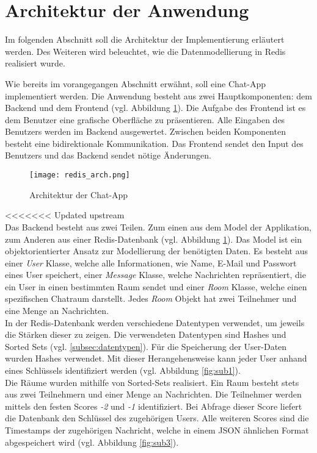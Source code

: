 
\section{Architektur der Anwendung}
Im folgenden Abschnitt soll die Architektur der Implementierung erläutert werden. Des Weiteren wird beleuchtet, wie die Datenmodellierung in \acs{Redis} realisiert wurde.

Wie bereits im vorangegangen Abschnitt erwähnt, soll eine Chat-App implementiert werden. Die Anwendung besteht aus zwei Hauptkomponenten: dem Backend und dem Frontend (vgl. Abbildung \ref{fig:arch}). Die Aufgabe des Frontend ist es dem Benutzer eine grafische Oberfläche zu präsentieren. Alle Eingaben des Benutzers werden im Backend ausgewertet. Zwischen beiden Komponenten besteht eine bidirektionale Kommunikation. Das Frontend sendet den Input des Benutzers und das Backend sendet nötige Änderungen.
\begin{figure}[h]
	\centering
	\texttt{[image: redis\_arch.png]}
	\caption{Architektur der Chat-App}
	\label{fig:arch}
\end{figure}
<<<<<<< Updated upstream
\\Das Backend besteht aus zwei Teilen. Zum einen aus dem Model der Applikation, zum Anderen aus einer \acs{Redis}-Datenbank (vgl. Abbildung \ref{fig:arch}). Das Model ist ein objektorientierter Ansatz zur Modellierung der benötigten Daten. Es besteht aus einer \textit{User} Klasse, welche alle Informationen, wie Name, E-Mail und Passwort eines User speichert, einer \textit{Message} Klasse, welche Nachrichten repräsentiert, die ein User in einen bestimmten Raum sendet und einer \textit{Room} Klasse, welche einen spezifischen Chatraum darstellt. Jedes \textit{Room} Objekt hat zwei Teilnehmer und eine Menge an Nachrichten.
\\In der \acs{Redis}-Datenbank werden verschiedene Datentypen verwendet, um jeweils die Stärken dieser zu zeigen. Die verwendeten Datentypen sind Hashes und Sorted Sets (vgl. \autoref{subsec:datentypen}). Für die Speicherung der User-Daten wurden Hashes verwendet. Mit dieser Herangehensweise kann jeder User anhand eines Schlüssels identifiziert werden (vgl. Abbildung \ref{fig:sub1}). 
\\Die Räume wurden mithilfe von Sorted-Sets realisiert. Ein Raum besteht stets aus zwei Teilnehmern und einer Menge an Nachrichten. Die Teilnehmer werden mittels den festen Scores \textit{-2} und \textit{-1} identifiziert. Bei Abfrage dieser Score liefert die Datenbank den Schlüssel des zugehörigen Users. Alle weiteren Scores sind die Timestamps der zugehörigen Nachricht, welche in einem JSON ähnlichen Format abgespeichert wird (vgl. Abbildung \ref{fig:sub3}).
